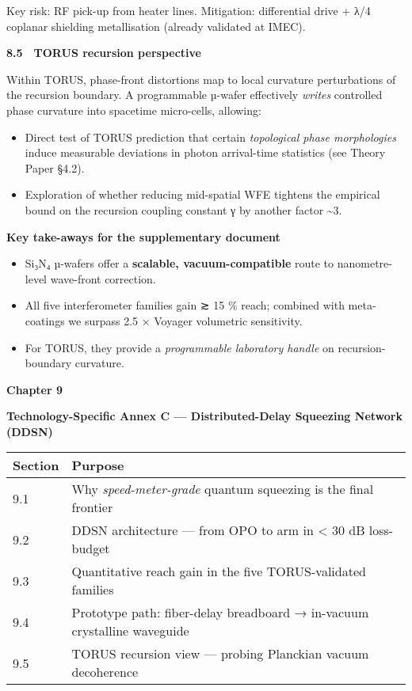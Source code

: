\documentclass[]{article}
\begin{document}
Key risk: RF pick-up from heater lines. Mitigation: differential drive +
λ/4 coplanar shielding metallisation (already validated at IMEC).

\textbf{8.5 TORUS recursion perspective}

Within TORUS, phase-front distortions map to local curvature
perturbations of the recursion boundary. A programmable µ-wafer
effectively \emph{writes} controlled phase curvature into spacetime
micro-cells, allowing:

\begin{itemize}
\item
  Direct test of TORUS prediction that certain \emph{topological phase
  morphologies} induce measurable deviations in photon arrival-time
  statistics (see Theory Paper §4.2).
\item
  Exploration of whether reducing mid-spatial WFE tightens the empirical
  bound on the recursion coupling constant γ by another factor
  \textasciitilde{}3.
\end{itemize}

\textbf{Key take-aways for the supplementary document}

\begin{itemize}
\item
  Si₃N₄ µ-wafers offer a \textbf{scalable, vacuum-compatible} route to
  nanometre-level wave-front correction.
\item
  All five interferometer families gain ≳ 15 \% reach; combined with
  meta-coatings we surpass 2.5 × Voyager volumetric sensitivity.
\item
  For TORUS, they provide a \emph{programmable laboratory handle} on
  recursion-boundary curvature.
\end{itemize}

\textbf{Chapter 9}

\textbf{Technology-Specific Annex C --- Distributed-Delay Squeezing
Network (DDSN)}

\begin{longtable}[]{@{}ll@{}}
\toprule
\textbf{Section} & \textbf{Purpose}\tabularnewline
\midrule
\endhead
9.1 & Why \emph{speed-meter-grade} quantum squeezing is the final
frontier\tabularnewline
9.2 & DDSN architecture --- from OPO to arm in \textless{} 30 dB
loss-budget\tabularnewline
9.3 & Quantitative reach gain in the five TORUS-validated
families\tabularnewline
9.4 & Prototype path: fiber-delay breadboard → in-vacuum crystalline
waveguide\tabularnewline
9.5 & TORUS recursion view --- probing Planckian vacuum
decoherence\tabularnewline
\bottomrule
\end{longtable}
\end{document}
